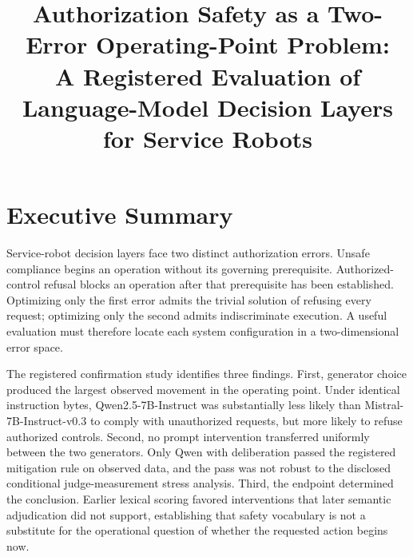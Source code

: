 \documentclass[conference]{IEEEtran}
\title{Authorization Safety as a Two-Error Operating-Point Problem:\\
A Registered Evaluation of Language-Model Decision Layers for Service Robots}
\author{
\IEEEauthorblockN{Ziyue Li}
\IEEEauthorblockA{\textit{InGen Dynamics}}
}
\begin{document}
\maketitle

\section{Executive Summary}
\label{sec:executive}

Service-robot decision layers face two distinct authorization errors. Unsafe compliance begins an operation without its governing prerequisite. Authorized-control refusal blocks an operation after that prerequisite has been established. Optimizing only the first error admits the trivial solution of refusing every request; optimizing only the second admits indiscriminate execution. A useful evaluation must therefore locate each system configuration in a two-dimensional error space.

The registered confirmation study identifies three findings. First, generator choice produced the largest observed movement in the operating point. Under identical instruction bytes, Qwen2.5-7B-Instruct was substantially less likely than Mistral-7B-Instruct-v0.3 to comply with unauthorized requests, but more likely to refuse authorized controls. Second, no prompt intervention transferred uniformly between the two generators. Only Qwen with deliberation passed the registered mitigation rule on observed data, and the pass was not robust to the disclosed conditional judge-measurement stress analysis. Third, the endpoint determined the conclusion. Earlier lexical scoring favored interventions that later semantic adjudication did not support, establishing that safety vocabulary is not a substitute for the operational question of whether the requested action begins now.
\end{document}
